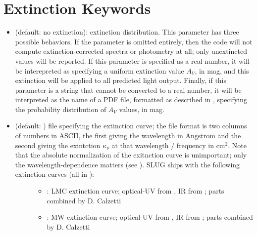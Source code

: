 \documentclass[letterpaper,10pt,english]{sphinxmanual}
\begin{document}
\section{Extinction Keywords}
\label{\detokenize{parameters:ssec-extinction-keywords}}\label{\detokenize{parameters:extinction-keywords}}\begin{itemize}
\item {} 
 (default: no extinction): extinction distribution. This parameter has three possible behaviors. If the parameter  is omitted entirely, then the code will not compute extinction-corrected spectra or photometry at all; only unextincted values will be reported. If this parameter is specified as a real number, it will be interepreted as specifying a uniform extinction value \(A_V\), in mag, and this extinction will be applied to all predicted light output. Finally, if this parameter is a string that cannot be converted to a real number, it will be interpreted as the name of a PDF file, formatted as described in {\hyperref[\detokenize{pdfs:sec-pdfs}]{}}, specifying the probability distribution of \(A_V\) values, in mag.

\item {} \begin{description}
\item[{ (default: ) file specifying the extinction curve; the file format is two columns of numbers in ASCII, the first giving the wavelength in Angstrom and the second giving the exintction \(\kappa_\nu\) at that wavelength / frequency in \(\mathrm{cm}^2\). Note that the absolute normalization of the exitnction curve is unimportant; only the wavelength-dependence matters (see {\hyperref[\detokenize{intro:ssec-spec-phot}]{}}). SLUG ships with the following extinction curves (all in ):}] \leavevmode\begin{itemize}
\item {} 
 : LMC extinction curve; optical-UV from , IR from ; parts combined by D. Calzetti

\item {} 
 : MW extinction curve; optical-UV from , IR from ; parts combined by D. Calzetti


\end{itemize}
\end{description}
\end{itemize}
\end{document}
